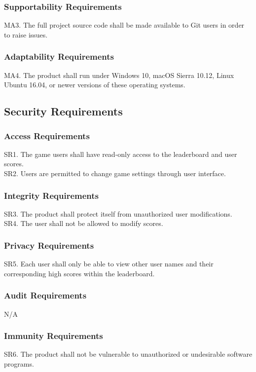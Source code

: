 \documentclass[12pt]{article}
\begin{document}
    \subsubsection{Supportability Requirements}
    MA3. The full project source code shall be made available to Git users in order to raise issues.
    
    \subsubsection{Adaptability Requirements}
    MA4. The product shall run under Windows 10, macOS Sierra 10.12, Linux Ubuntu 16.04, or newer versions of these operating systems.
    
\subsection{Security Requirements}
    \subsubsection{Access Requirements}
    SR1. The game users shall have read-only access to the leaderboard and user scores. \\
    SR2. Users are permitted to change game settings through user interface.
    
    \subsubsection{Integrity Requirements}
    SR3. The product shall protect itself from unauthorized user modifications.\\
    SR4. The user shall not be allowed to modify scores.
    
    \subsubsection{Privacy Requirements}
    SR5. Each user shall only be able to view other user names and their corresponding high scores within the leaderboard.
    
    \subsubsection{Audit Requirements}
    N/A
    
    \subsubsection{Immunity Requirements}
    SR6. The product shall not be vulnerable to unauthorized or undesirable software programs.
    
\end{document}
